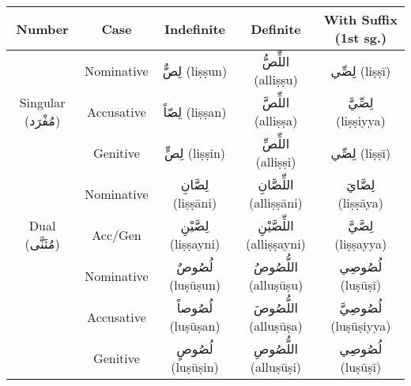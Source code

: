 \documentclass[letter,12pt]{article}
\begin{document}
\begin{tabular}{|c|c|c|c|c|}
\hline
\textbf{Number} & \textbf{Case} & \textbf{Indefinite} & \textbf{Definite} & \textbf{With Suffix (1st sg.)} \\
\hline
\multirow{3}{*}{Singular (\textarabic{مُفْرَد})} 
 & Nominative   & \textarabic{لِصٌّ} (liṣṣun) & \textarabic{اللِّصُّ} (alliṣṣu) & \textarabic{لِصِّي} (liṣṣī) \\
 & Accusative   & \textarabic{لِصّاً} (liṣṣan) & \textarabic{اللِّصَّ} (alliṣṣa) & \textarabic{لِصِّيَّ} (liṣṣiyya) \\
 & Genitive     & \textarabic{لِصٍّ} (liṣṣin) & \textarabic{اللِّصِّ} (alliṣṣi) & \textarabic{لِصِّي} (liṣṣī) \\
\hline
\multirow{3}{*}{Dual (\textarabic{مُثَنَّى})} 
 & Nominative   & \textarabic{لِصَّانِ} (liṣṣāni) & \textarabic{اللِّصَّانِ} (alliṣṣāni) & \textarabic{لِصَّايَ} (liṣṣāya) \\
 & Acc/Gen      & \textarabic{لِصَّيْنِ} (liṣṣayni) & \textarabic{اللِّصَّيْنِ} (alliṣṣayni) & \textarabic{لِصَّيَّ} (liṣṣayya) \\
\hline
\multirow{3}{*}{Plural (\textarabic{جَمْع})} 
  & Nominative    & \textarabic{لُصُوصٌ} (luṣūṣun) & \textarabic{اللُّصُوصُ} (alluṣūṣu) & \textarabic{لُصُوصِي} (luṣūṣī) \\
  & Accusative      & \textarabic{لُصُوصاً} (luṣūṣan) & \textarabic{اللُّصُوصَ} (alluṣūṣa) & \textarabic{لُصُوصِيَّ} (luṣūṣiyya) \\
  & Genitive          & \textarabic{لُصُوصٍ} (luṣūṣin) & \textarabic{اللُّصُوصِ} (alluṣūṣi) & \textarabic{لُصُوصِي} (luṣūṣī) \\
\hline
\end{tabular}
\end{document}
